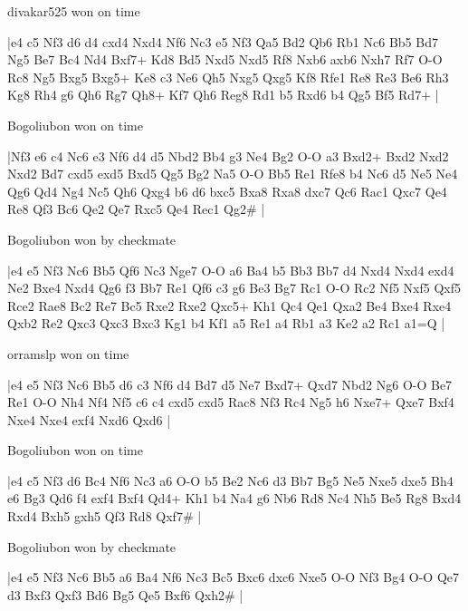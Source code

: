 \showboard

divakar525 won on time

\makegametitle
|e4 c5 Nf3 d6 d4 cxd4 Nxd4 Nf6 Nc3 e5 Nf3 Qa5 Bd2 Qb6 Rb1 Nc6 Bb5 Bd7 Ng5 Be7 Bc4 Nd4 Bxf7+ Kd8 Bd5 Nxd5 Nxd5 Rf8 Nxb6 axb6 Nxh7 Rf7 O-O Rc8 Ng5 Bxg5 Bxg5+ Ke8 c3 Ne6 Qh5 Nxg5 Qxg5 Kf8 Rfe1 Re8 Re3 Be6 Rh3 Kg8 Rh4 g6 Qh6 Rg7 Qh8+ Kf7 Qh6 Reg8 Rd1 b5 Rxd6 b4 Qg5 Bf5 Rd7+  |

\showboard

Bogoliubon won on time

\makegametitle
|Nf3 e6 c4 Nc6 e3 Nf6 d4 d5 Nbd2 Bb4 g3 Ne4 Bg2 O-O a3 Bxd2+ Bxd2 Nxd2 Nxd2 Bd7 cxd5 exd5 Bxd5 Qg5 Bg2 Na5 O-O Bb5 Re1 Rfe8 b4 Nc6 d5 Ne5 Ne4 Qg6 Qd4 Ng4 Nc5 Qh6 Qxg4 b6 d6 bxc5 Bxa8 Rxa8 dxc7 Qc6 Rac1 Qxc7 Qe4 Re8 Qf3 Bc6 Qe2 Qe7 Rxc5 Qe4 Rec1 Qg2\#  |

\showboard

Bogoliubon won by checkmate

\makegametitle
|e4 e5 Nf3 Nc6 Bb5 Qf6 Nc3 Nge7 O-O a6 Ba4 b5 Bb3 Bb7 d4 Nxd4 Nxd4 exd4 Ne2 Bxe4 Nxd4 Qg6 f3 Bb7 Re1 Qf6 c3 g6 Be3 Bg7 Rc1 O-O Rc2 Nf5 Nxf5 Qxf5 Rce2 Rae8 Bc2 Re7 Bc5 Rxe2 Rxe2 Qxc5+ Kh1 Qc4 Qe1 Qxa2 Be4 Bxe4 Rxe4 Qxb2 Re2 Qxc3 Qxc3 Bxc3 Kg1 b4 Kf1 a5 Re1 a4 Rb1 a3 Ke2 a2 Rc1 a1=Q  |

\showboard

orramslp won on time

\makegametitle
|e4 e5 Nf3 Nc6 Bb5 d6 c3 Nf6 d4 Bd7 d5 Ne7 Bxd7+ Qxd7 Nbd2 Ng6 O-O Be7 Re1 O-O Nh4 Nf4 Nf5 c6 c4 cxd5 cxd5 Rac8 Nf3 Rc4 Ng5 h6 Nxe7+ Qxe7 Bxf4 Nxe4 Nxe4 exf4 Nxd6 Qxd6  |

\showboard

Bogoliubon won on time

\makegametitle
|e4 c5 Nf3 d6 Bc4 Nf6 Nc3 a6 O-O b5 Be2 Nc6 d3 Bb7 Bg5 Ne5 Nxe5 dxe5 Bh4 e6 Bg3 Qd6 f4 exf4 Bxf4 Qd4+ Kh1 b4 Na4 g6 Nb6 Rd8 Nc4 Nh5 Be5 Rg8 Bxd4 Rxd4 Bxh5 gxh5 Qf3 Rd8 Qxf7\#  |

\showboard

Bogoliubon won by checkmate

\makegametitle
|e4 e5 Nf3 Nc6 Bb5 a6 Ba4 Nf6 Nc3 Bc5 Bxc6 dxc6 Nxe5 O-O Nf3 Bg4 O-O Qe7 d3 Bxf3 Qxf3 Bd6 Bg5 Qe5 Bxf6 Qxh2\#  |

